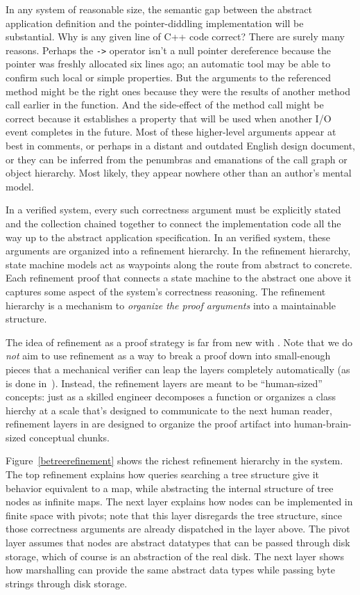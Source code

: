 In any system of reasonable size, the semantic gap between the abstract
application definition and the pointer-diddling implementation will be
substantial.
Why is any given line of C++ code correct? There are surely many reasons.
Perhaps the \texttt{->} operator isn't a null pointer dereference because
the pointer was freshly allocated six lines ago; an automatic tool may
be able to confirm such local or simple properties.
But the arguments to the referenced method might be the right ones because
they were the results of another method call earlier in the function.
And the side-effect of the method call might be correct
because it establishes a property that will be used when another I/O
event completes in the future.
Most of these higher-level arguments appear at best in comments,
or perhaps in a distant and outdated English design document,
or they can be inferred from the penumbras and emanations of the
call graph or object hierarchy.
Most likely, they appear nowhere other than an author's mental model.

In a verified system, every such correctness argument must be explicitly
stated and the collection chained together to connect the implementation
code all the way up to the abstract application specification.
In an {\ironstar} verified system, these arguments are organized into
a refinement hierarchy.
In the refinement hierarchy, state machine models act as waypoints
along the route from abstract to concrete. Each refinement proof that
connects a state machine to the abstract one above it captures some
aspect of the system's correctness reasoning. 
The refinement hierarchy is a mechanism to \textit{organize the
proof arguments} into a maintainable structure.


The idea of refinement as a proof strategy is far from new with {\ironstar}.
Note that we do \textit{not} aim to use refinement
as a way to break a proof down into small-enough pieces that a
mechanical verifier can leap the layers completely automatically
(as is done in~\cite{cspec,ironarmada}).
Instead, the refinement layers are meant to be ``human-sized'' concepts:
just as a skilled engineer decomposes a function or organizes a
class hierchy at a scale that's designed to communicate to the next
human reader,
refinement layers in {\ironstar} are designed to organize the proof
artifact into human-brain-sized conceptual chunks.

Figure~\ref{betreerefinement} shows the richest refinement hierarchy in the
{\veribetrfs} system.
The top refinement explains how queries searching a {\bepsilon}tree
structure give it behavior equivalent to a map,
while abstracting the internal structure of tree nodes as infinite
maps.
The next layer explains how nodes can be implemented in finite space
with pivots; note that this layer disregards the {\bepsilon}tree structure,
since those correctness arguments are already dispatched in the
layer above.
The pivot layer assumes that nodes are abstract datatypes that can
be passed through disk storage, which of course is an abstraction of
the real disk. The next layer shows how marshalling can provide the
same abstract data types while passing byte strings through disk storage.

